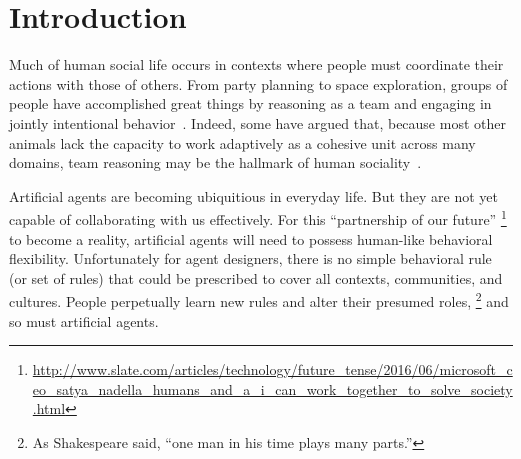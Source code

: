 
\section{Introduction}
\label{sec:intro}

Much of human social life occurs in contexts where people must
coordinate their actions with those of others.  From party planning to
space exploration, groups of people have accomplished great things by
reasoning as a team and engaging in jointly intentional
behavior~\cite{searle1995construction}.  Indeed, some have argued
that, because most other animals lack the capacity to work adaptively
as a cohesive unit across many domains, team reasoning may be the
hallmark of human sociality~\cite{tomasello2005understanding}.


Artificial agents are becoming ubiquitious in everyday life.  But they
are not yet capable of collaborating with us effectively.  For this
``partnership of our future''%
\footnote{\url{http://www.slate.com/articles/technology/future_tense/2016/06/microsoft_ceo_satya_nadella_humans_and_a_i_can_work_together_to_solve_society.html}}
to become a reality, artificial agents will need to possess human-like
behavioral flexibility.  Unfortunately for agent designers, there is
no simple behavioral rule (or set of rules) that could be prescribed
to cover all contexts, communities, and cultures.  People perpetually
learn new rules and alter their presumed roles,%
\footnote{As Shakespeare said, ``one man in his time plays many parts.''}
and so must artificial agents.




